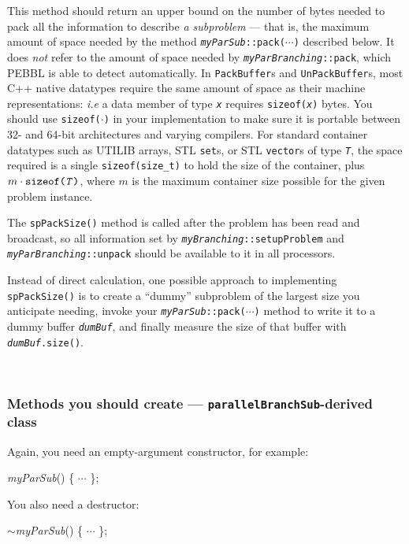  This method should return an upper bound on
the number of bytes needed to pack all the information to describe
\emph{a subproblem} --- that is, the maximum amount of space needed by
the method \texttt{\emph{myParSub}::pack($\cdots$)} described below.
It does \emph{not} refer to the amount of space needed by
\texttt{\emph{myParBranching}::pack}, which PEBBL is able to detect
automatically. In \texttt{PackBuffer}s and \texttt{UnPackBuffer}s,
most C++ native datatypes require the same amount of space as their
machine representations: \emph{i.e} a data member of type
\texttt{\emph{x}} requires \texttt{sizeof(\emph{x})} bytes.  You
should use \texttt{sizeof($\cdot$)} in your implementation to make
sure it is portable between 32- and 64-bit architectures and varying
compilers.  For standard container datatypes such as 
UTILIB arrays, STL \texttt{set}s, or STL
\texttt{vector}s of type \texttt{\emph{T}}, the space required is a single
\texttt{sizeof(size\_t)} to hold the size of the container, plus
$m\cdot\text{\texttt{sizeof(\emph{T})}}$, where $m$ is the maximum
container size possible for the given problem instance.

The \texttt{spPackSize()} method is
called after the problem has been read and broadcast, so all
information set by \texttt{\emph{myBranching}::setupProblem} and
\texttt{\emph{myParBranching}::unpack} should be available to it in all
processors.

Instead of direct calculation, one possible approach to implementing
\texttt{spPackSize()} is to create a ``dummy'' subproblem of the largest
size you anticipate needing, invoke your \texttt{\emph{myParSub}::pack($\cdots$)}
method to write it to a dummy buffer \texttt{\emph{dumBuf}}, and finally measure
the size of that buffer with \texttt{\emph{dumBuf}.size()}.

~

\subsubsection{Methods you should create ---
  \texttt{parallelBranchSub}-derived class}
\label{sec:parsubmethods}
Again, you need an empty-argument constructor, for example:
\begin{codeblock}
\emph{myParSub}() \{  $\cdots$ \}; \\
\end{codeblock}

You also need a destructor:
\begin{codeblock}
$\sim$\emph{myParSub}() \{ $\cdots$ \}; \\
\end{codeblock}

